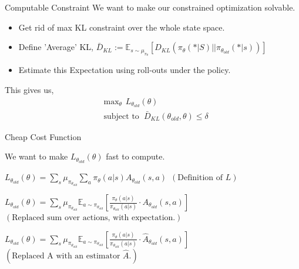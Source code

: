 \documentclass{beamer}
\begin{document}
\begin{frame}{Computable Constraint}
We want to make our constrained optimization solvable.

\begin{itemize}
    \item Get rid of max KL constraint over the whole state space. 
    \item Define 'Average' KL, $\bar{D}_{KL} := \mathbb{E}_{s \sim \mu_{\pi_{\theta}}} \left[ D_{KL}\left(\pi_{\theta}(* \vert S) \vert\vert \pi_{\theta_{old}}(*\lvert s) \right) \right] $
    \item Estimate this Expectation using roll-outs under the policy.
\end{itemize}

This gives us, 
\begin{align*}
     &\text{max}_{\theta} \hspace{5pt} L_{\theta_{old}}(\theta) \\
     &\text{subject to }  \hspace{3pt} \bar{D}_{KL}\left(\theta_{old}, \theta \right) \leq \delta
\end{align*}


\end{frame}

\begin{frame}{Cheap Cost Function}

We want to make $L_{\theta_{old}}(\theta)$ fast to compute. 
\begin{itemize}
    {\item $L_{\theta_{old}}(\theta) = \sum_{s} \mu_{\pi_{\theta_{old}}} \sum_a \pi_{\theta}(a \vert s) A_{\theta_{old}}(s,a) \hspace{5pt} \left(\text{Definition of $L$}\right)$}
    {\item $L_{\theta_{old}}(\theta) = \sum_{s} \mu_{\pi_{\theta_{old}}} \mathbb{E}_{a \sim \pi_{\theta_{old}}} \left[ \frac{\pi_{\theta}(a \vert s)}{\pi_{\theta_{old}}(a \vert s)} \cdot A_{\theta_{old}}(s,a) \right] $ $\left( \text{Replaced sum over actions, with expectation}. \right)$}
   {\item  $L_{\theta_{old}}(\theta) = \sum_{s} \mu_{\pi_{\theta_{old}}} \mathbb{E}_{a \sim \pi_{\theta_{old}}} \left[ \frac{\pi_{\theta}(a \vert s)}{\pi_{\theta_{old}}( a \vert s)} \cdot \hat{A}_{\theta_{old}}(s,a) \right] $ $\left( \text{Replaced A with an estimator $\hat{A}$}. \right)$ }
\end{itemize}
\end{frame}
\end{document}
